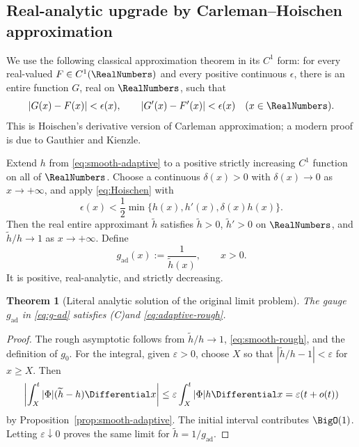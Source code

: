 \documentclass[11pt]{article}
\newtheorem{theorem}{Theorem}[section]
\theoremstyle{definition}
\theoremstyle{remark}
\newcommand{\Ceq}{\textup{(C)}}
\begin{document}
\subsection{Real-analytic upgrade by Carleman--Hoischen approximation}

We use the following classical approximation theorem in its \(C^1\) form:
for every real-valued \(F\in C^1(\RealNumbers)\) and every positive continuous
\(\epsilon\), there is an entire function \(G\), real on \(\RealNumbers\), such that
\begin{equation}
 |G(x)-F(x)|<\epsilon(x),
 \qquad
 |G'(x)-F'(x)|<\epsilon(x)
 \quad(x\in\RealNumbers).
 \label{eq:Hoischen}
\end{equation}
This is Hoischen's derivative version of Carleman approximation; a modern
proof is due to Gauthier and Kienzle\cite{gauthier-kienzle}.

Extend \(h\) from \eqref{eq:smooth-adaptive} to a positive strictly increasing
\(C^1\) function on all of \(\RealNumbers\).  Choose a continuous
\(\delta(x)>0\) with \(\delta(x)\to0\) as \(x\to+\infty\), and apply
\eqref{eq:Hoischen} with
\begin{equation}
 \epsilon(x)<\frac12\min\{h(x),h'(x),\delta(x)h(x)\}.
 \label{eq:Hoischen-error}
\end{equation}
Then the real entire approximant \(\widetilde h\) satisfies
\(\widetilde h>0\), \(\widetilde h'>0\) on \(\RealNumbers\), and
\(\widetilde h/h\to1\) as \(x\to+\infty\).  Define
\begin{equation}
 g_{\mathrm{ad}}(x):=\frac1{\widetilde h(x)},
 \qquad x>0.
 \label{eq:g-ad}
\end{equation}
It is positive, real-analytic, and strictly decreasing.

\begin{theorem}[Literal analytic solution of the original limit problem]
\label{thm:analytic-adaptive}
The gauge \(g_{\mathrm{ad}}\) in \eqref{eq:g-ad} satisfies \Ceq and
\eqref{eq:adaptive-rough}.
\end{theorem}

\begin{proof}
The rough asymptotic follows from
\(\widetilde h/h\to1\), \eqref{eq:smooth-rough}, and the definition of
\(g_0\).  For the integral, given \(\varepsilon>0\), choose \(X\) so that
\(|\widetilde h/h-1|<\varepsilon\) for \(x\ge X\).  Then
\[
 \left|\int_X^t|\Phi|(\widetilde h-h)\Differential x\right|
 \le\varepsilon\int_X^t|\Phi|h\Differential x
 =\varepsilon(t+o(t))
\]
by Proposition~\ref{prop:smooth-adaptive}.  The initial interval contributes
\(\BigO(1)\).  Letting \(\varepsilon\downarrow0\) proves the same limit for
\(\widetilde h=1/g_{\mathrm{ad}}\).
\end{proof}
\end{document}
